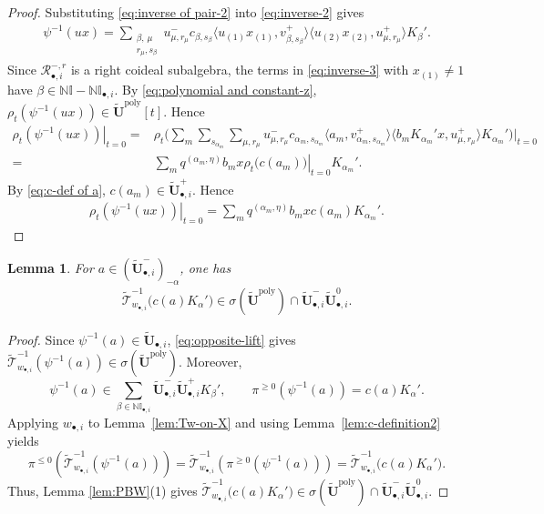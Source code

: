\documentclass[a4paper,reqno,12pt]{amsart}
\numberwithin{equation}{section}
\newtheorem{lemma}[proposition]{Lemma}
\theoremstyle{definition}
\theoremstyle{plain}
\theoremstyle{definition}
\def\N{\mathbb N}
\def\I{\mathbb I}
\def\bIi{\I_{\bullet,i}}
\def\bwi{w_{\bullet,i}}
\def\tU{\widetilde{\mathbf U}}
\def \tbiU{\tU_{\bullet,i}}
\def\tT{\widetilde{\mathscr T}}
\def\cR{\mathcal R}
\newcommand{\poly}{\mathrm{poly}}
\begin{document}
\begin{proof}
Substituting \eqref{eq:inverse of pair-2} into \eqref{eq:inverse-2} gives
\begin{align}
 \psi^{-1}(ux)=\sum_{\substack{\beta,\,\mu\\r_\mu,s_\beta}}
u^-_{\mu,r_\mu}c_{\beta,s_\beta}
\langle u_{(1)}x_{(1)},v^+_{\beta,s_\beta}\rangle\langle u_{(2)}x_{(2)},u^+_{\mu,r_\mu}\rangle K_\beta'.\label{eq:inverse-3}   
\end{align}
Since $\cR_{\bullet,i}^{-,r}$ is a right coideal subalgebra, the terms in \eqref{eq:inverse-3} with $x_{(1)}\ne1$ have $\beta\in\N\I-\N\bIi$. By \eqref{eq:polynomial and constant-z}, $\rho_t(\psi^{-1}(ux))\in\tU^\poly[t]$. Hence
\begin{align*}
 \left.\rho_t(\psi^{-1}(ux))\right|_{t=0}=& \rho_t\Big(\sum_{m}\sum_{s_{\alpha_m}}\sum_{\mu,r_\mu}
u^-_{\mu,r_\mu}c_{\alpha_m,s_{\alpha_m}}\langle a_m,v^+_{\alpha_m,s_{\alpha_m}}\rangle\langle b_mK_{\alpha_m}'x,u^+_{\mu,r_\mu}\rangle K_{\alpha_m}'\Big) \Big|_{t=0} \\
=&\sum_mq^{(\alpha_m,\eta)} b_mx \left.\rho_t\big(c(a_m)\big)\right|_{t=0}K_{\alpha_m}'. 
\end{align*}
By \eqref{eq:c-def of a}, $c(a_m)\in\tbiU^+$. Hence
\begin{align*}
    \left.\rho_t(\psi^{-1}(ux))\right|_{t=0}=\sum_m q^{(\alpha_m,\eta)}b_mx c(a_m)K_{\alpha_m}'.
\end{align*}
\end{proof}

\begin{lemma}\label{lem:domain}
For $a\in(\tbiU^-)_{-\alpha}$, one has
\begin{align}
\tT_{\bwi}^{-1}\bigl(c(a)K_\alpha'\bigr)
\in\sigma(\tU^\poly)\cap\tbiU^-\tbiU^0.
\label{eq:coefficient-domain}
\end{align}
\end{lemma}

\begin{proof}
Since $\psi^{-1}(a)\in\tbiU$, \eqref{eq:opposite-lift} gives
$\tT_{\bwi}^{-1}(\psi^{-1}(a))\in\sigma(\tU^\poly)$. Moreover, 
\begin{equation*}
  \psi^{-1}(a)\in\sum_{\beta\in\N\bIi}\tbiU^-\tbiU^+K_\beta',\qquad \pi^{\ge0}(\psi^{-1}(a))=c(a)K_{\alpha}' .
\end{equation*}
Applying $\bwi$ to Lemma~\ref{lem:Tw-on-X} and using Lemma~\ref{lem:c-definition2} yields
\begin{equation*}
    \pi^{\le0}(\tT_{\bwi}^{-1}(\psi^{-1}(a)))=\tT_{\bwi}^{-1}(\pi^{\ge0}(\psi^{-1}(a)))=\tT_{\bwi}^{-1}\bigl(c(a)K_\alpha'\bigr).
\end{equation*}
Thus, Lemma \ref{lem:PBW}(1) gives $\tT_{\bwi}^{-1}\bigl(c(a)K_\alpha'\bigr)
\in\sigma(\tU^\poly)\cap\tbiU^-\tbiU^0$.
\end{proof}
\end{document}
